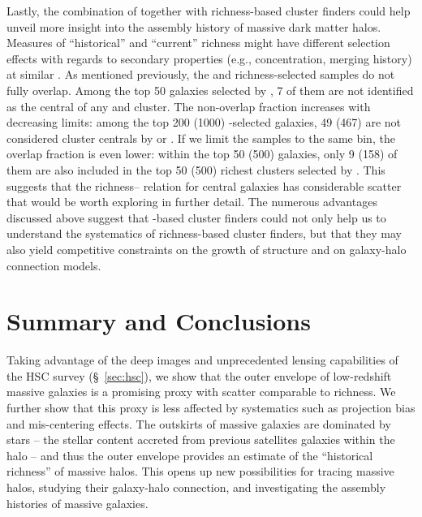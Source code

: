 \documentclass[fleqn,usenatbib,useAMS]{mnras}
\begin{document}
\begin{CJK*}{UTF8}{gbsn}
    Lastly, the combination of \mstar{} together with richness-based cluster finders could help
    unveil more insight into the assembly history of massive dark matter halos. 
    Measures of ``historical'' and ``current'' richness might have different selection effects with
    regards to secondary properties (e.g., concentration, merging history) at similar \mvir{}.
    As mentioned previously, the \mstar{} and richness-selected samples do not fully overlap.
    Among the top 50 galaxies selected by , 7 of them are not identified as the
    central of any \redm{} and \camira{} cluster.
    The non-overlap fraction increases with decreasing \mstar{} limits: among the top 200 (1000)
    -selected galaxies, 49 (467) are not considered cluster centrals by \redm{} or
    \camira{}.
    If we limit the samples to the same \topn{} bin, the overlap fraction is even lower: within the
    top 50 (500)  galaxies, only 9 (158) of them are also included in the top 50
    (500) richest clusters selected by \redm{}. This suggests that the richness--\mstar{} relation
    for central galaxies has considerable scatter that would be worth exploring in further detail.
    The numerous advantages discussed above suggest that \mstar{}-based cluster finders could not
    only help us to understand the systematics of richness-based cluster finders, but that they may
    also yield competitive constraints on the growth of structure and on galaxy-halo connection
    models.

\section{Summary and Conclusions}
    \label{sec:summary}

    Taking advantage of the deep images and unprecedented lensing capabilities of the HSC survey
    (\S\ \ref{sec:hsc}), we show that the outer envelope of low-redshift massive galaxies is a
    promising \mvir{} proxy with scatter comparable to richness. 
    We further show that this proxy is less affected by systematics such as projection bias and
    mis-centering effects. 
    The outskirts of massive galaxies are dominated by \exsitu{} stars -- the stellar content
    accreted from previous satellites galaxies within the halo -- and thus the outer envelope
    \mstar{} provides an estimate of the ``historical richness'' of massive halos.
    This opens up new possibilities for tracing massive halos, studying their galaxy-halo connection,
    and investigating the assembly histories of massive galaxies.
    

\end{CJK*}
\end{document}
